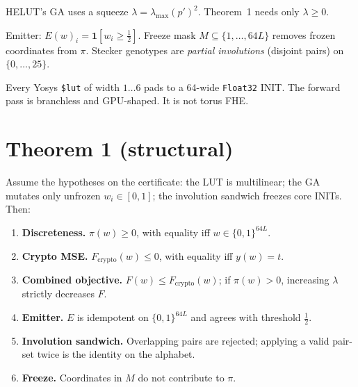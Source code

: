 \begin{remark}
HELUT's GA uses a squeeze $\lambda=\lambda_{\max}(p')^2$.
Theorem~1 needs only $\lambda\ge 0$.
\end{remark}

Emitter: $E(w)_i=\mathbf{1}[w_i\ge\tfrac12]$.
Freeze mask $M\subseteq\{1,\dots,64L\}$ removes frozen coordinates from
$\pi$.
Stecker genotypes are \emph{partial involutions} (disjoint pairs) on
$\{0,\dots,25\}$.

Every Yosys \texttt{\$lut} of width $1\ldots 6$ pads to a 64-wide
\texttt{Float32} INIT.
The forward pass is branchless and GPU-shaped.
It is not torus FHE.

\section{Theorem 1 (structural)}
\label{sec:thm-tensorlut}


\begin{theorem}
\label{thm:tensorlut}
Assume the hypotheses on the certificate: the LUT is multilinear; the GA
mutates only unfrozen $w_i\in[0,1]$; the involution sandwich freezes core
INITs.
Then:
\begin{enumerate}
  \item \textbf{Discreteness.}
        $\pi(w)\ge 0$, with equality iff $w\in\{0,1\}^{64L}$.
  \item \textbf{Crypto MSE.}
        $F_{\mathrm{crypto}}(w)\le 0$, with equality iff $y(w)=t$.
  \item \textbf{Combined objective.}
        $F(w)\le F_{\mathrm{crypto}}(w)$; if $\pi(w)>0$, increasing
        $\lambda$ strictly decreases $F$.
  \item \textbf{Emitter.}
        $E$ is idempotent on $\{0,1\}^{64L}$ and agrees with threshold
        $\tfrac12$.
  \item \textbf{Involution sandwich.}
        Overlapping pairs are rejected; applying a valid pair-set twice
        is the identity on the alphabet.
  \item \textbf{Freeze.}
        Coordinates in $M$ do not contribute to $\pi$.
\end{enumerate}
\end{theorem}

